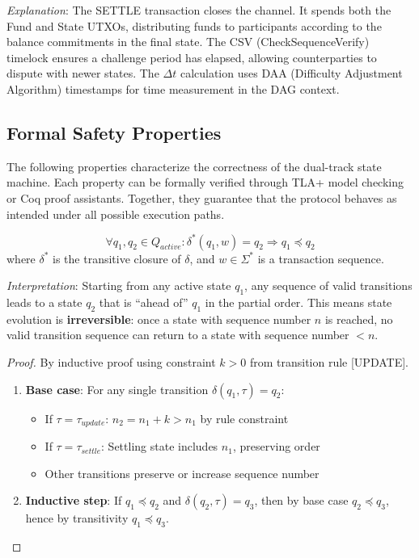 \textit{Explanation}: The SETTLE transaction closes the channel. It spends both the Fund and State UTXOs, distributing funds to participants according to the balance commitments in the final state. The CSV (CheckSequenceVerify) timelock ensures a challenge period has elapsed, allowing counterparties to dispute with newer states. The $\Delta t$ calculation uses DAA (Difficulty Adjustment Algorithm) timestamps for time measurement in the DAG context.

\subsection{Formal Safety Properties}

The following properties characterize the correctness of the dual-track state machine. Each property can be formally verified through TLA+ model checking or Coq proof assistants. Together, they guarantee that the protocol behaves as intended under all possible execution paths.

\begin{theorem}[Monotonicity]
$$\forall q_1, q_2 \in Q_{active}: \delta^*(q_1, w) = q_2 \Rightarrow q_1 \preceq q_2$$
where $\delta^*$ is the transitive closure of $\delta$, and $w \in \Sigma^*$ is a transaction sequence.
\end{theorem}

\textit{Interpretation}: Starting from any active state $q_1$, any sequence of valid transitions leads to a state $q_2$ that is ``ahead of'' $q_1$ in the partial order. This means state evolution is \textbf{irreversible}: once a state with sequence number $n$ is reached, no valid transition sequence can return to a state with sequence number $< n$.

\begin{proof}
By inductive proof using constraint $k > 0$ from transition rule [UPDATE].
\begin{enumerate}
    \item \textbf{Base case}: For any single transition $\delta(q_1, \tau) = q_2$:
    \begin{itemize}
        \item If $\tau = \tau_{update}$: $n_2 = n_1 + k > n_1$ by rule constraint
        \item If $\tau = \tau_{settle}$: Settling state includes $n_1$, preserving order
        \item Other transitions preserve or increase sequence number
    \end{itemize}
    \item \textbf{Inductive step}: If $q_1 \preceq q_2$ and $\delta(q_2, \tau) = q_3$, then by base case $q_2 \preceq q_3$, hence by transitivity $q_1 \preceq q_3$.
\end{enumerate}
\end{proof}

